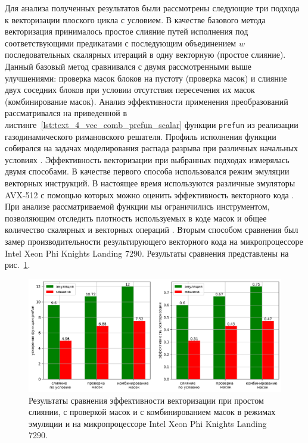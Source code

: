 Для анализа полученных результатов были рассмотрены следующие три подхода к векторизации плоского цикла с условием.
В качестве базового метода векторизация принималось простое слияние путей исполнения под соответствующими предикатами с последующим объединением $w$ последовательных скалярных итераций в одну векторную (простое слияние).
Данный базовый метод сравнивался с двумя рассмотренными выше улучшениями: проверка масок блоков на пустоту (проверка масок) и слияние двух соседних блоков при условии отсутствия пересечения их масок (комбинирование масок).
Анализ эффективности применения преобразований рассматривался на приведенной в листинге~\ref{lst:text_4_vec_comb_prefun_scalar} функции \texttt{prefun} из реализации газодинамического римановского решателя.
Профиль исполнения функции собирался на задачах моделирования распада разрыва при различных начальных условиях \cite{Toh2024VecRiemann,Zeng2021VecRiemann}.
Эффективность векторизации при выбранных подходах измерялась двумя способами.
В качестве первого способа использовался режим эмуляции векторных инструкций.
В настоящее время используются различные эмуляторы AVX-512 с помощью которых можно оценить эффективность векторного кода \cite{Lee2024VecGem}.
При анализе рассматриваемой функции мы ограничились инструментом, позволяющим отследить плотность используемых в коде масок и общее количество скалярных и векторных операций \cite{Rybakov2023VecShvindt}.
Вторым способом сравнения был замер производительности результирующего векторного кода на микропроцессоре Intel Xeon Phi Knights Landing 7290.
Результаты сравнения представлены на рис.~\ref{fig:text_4_vec_comb_mask_res}.

\begin{figure}[ht]
\centering
\includegraphics[width=1.0\textwidth]{./pics/text_4_vec_comb_mask/res.png}
\singlespacing
{}\caption{Результаты сравнения эффективности векторизации при простом слиянии, с проверкой масок и с комбинированием масок в режимах эмуляции и на микропроцессоре Intel Xeon Phi Knights Landing 7290.}
\label{fig:text_4_vec_comb_mask_res}
\end{figure}

